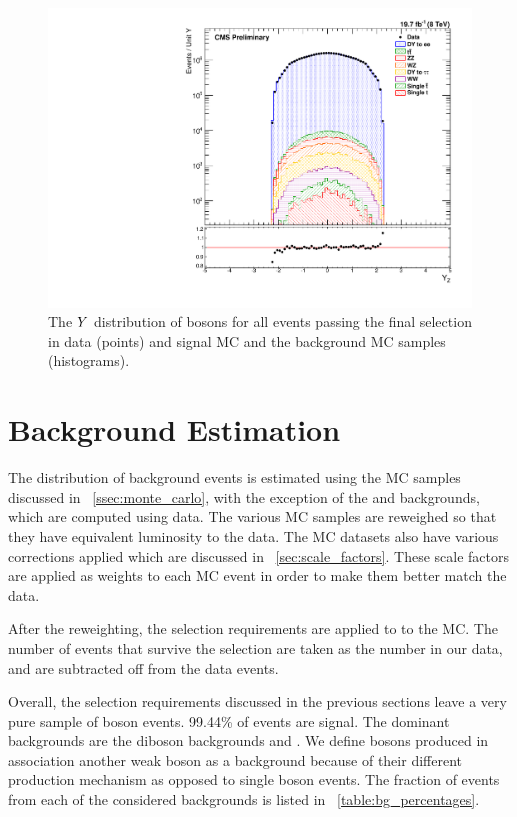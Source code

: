 \begin{figure}[!htbp]
    \centering
    \includegraphics[width=\textwidth]{figures/z_rapidity_powheg.pdf}
    \caption[
        The $\rapidity$ distribution of \Z bosons in data and MC with \POWHEG
        signal MC.
    ]{
        The $\rapidity$ distribution of \Z bosons for all events passing the
        final selection in data (points) and \POWHEG signal MC and the
        background MC samples (histograms).
    }
    \label{fig:z_rapidity_powheg}
\end{figure}

\section{Background Estimation}

The distribution of background events is estimated using the MC samples
discussed in \SEC~\ref{ssec:monte_carlo}, with the exception of the \QCDjets
and \wjets backgrounds, which are computed using data. The various MC samples
are reweighed so that they have equivalent luminosity to the data. The MC
datasets also have various corrections applied which are discussed in
\SEC~\ref{sec:scale_factors}. These scale factors are applied as weights to
each MC event in order to make them better match the data.

After the reweighting, the selection requirements are applied to to the MC. The
number of events that survive the selection are taken as the number in our
data, and are subtracted off from the data events.

Overall, the selection requirements discussed in the previous sections leave a
very pure sample of \Z boson events. 99.44\% of events are signal. The dominant
backgrounds are the diboson backgrounds and \ttbar. We define \Z bosons
produced in association another weak boson as a background because of their
different production mechanism as opposed to single \Z boson events. The
fraction of events from each of the considered backgrounds is listed in
\TAB~\ref{table:bg_percentages}.

